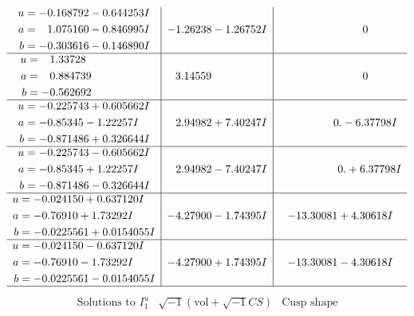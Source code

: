 \documentclass[1p]{elsarticle_modified}
\theoremstyle{definition}
\newcommand{\I}{\sqrt{-1}}
\begin{document}
$$\begin{array}{c|c|c}
\begin{aligned}
u &= -0.168792 - 0.644253 I \\
a &= \phantom{-}1.075160 - 0.846995 I \\
b &= -0.303616 - 0.146890 I\end{aligned}
 & -1.26238 - 1.26752 I & \phantom{-0.000000 } 0 \\ \hline\begin{aligned}
u &= \phantom{-}1.33728\phantom{ +0.000000I} \\
a &= \phantom{-}0.884739\phantom{ +0.000000I} \\
b &= -0.562692\phantom{ +0.000000I}\end{aligned}
 & \phantom{-}3.14559\phantom{ +0.000000I} & \phantom{-0.000000 } 0 \\ \hline\begin{aligned}
u &= -0.225743 + 0.605662 I \\
a &= -0.85345 - 1.22257 I \\
b &= -0.871486 + 0.326644 I\end{aligned}
 & \phantom{-}2.94982 + 7.40247 I & \phantom{-0.000000 } 0. - 6.37798 I \\ \hline\begin{aligned}
u &= -0.225743 - 0.605662 I \\
a &= -0.85345 + 1.22257 I \\
b &= -0.871486 - 0.326644 I\end{aligned}
 & \phantom{-}2.94982 - 7.40247 I & \phantom{-0.000000 -}0. + 6.37798 I \\ \hline\begin{aligned}
u &= -0.024150 + 0.637120 I \\
a &= -0.76910 + 1.73292 I \\
b &= -0.0225561 + 0.0154055 I\end{aligned}
 & -4.27900 - 1.74395 I & -13.30081 + 4.30618 I \\ \hline\begin{aligned}
u &= -0.024150 - 0.637120 I \\
a &= -0.76910 - 1.73292 I \\
b &= -0.0225561 - 0.0154055 I\end{aligned}
 & -4.27900 + 1.74395 I & -13.30081 - 4.30618 I\\
 \hline 
 \end{array}$$\newpage$$\begin{array}{c|c|c}  
\text{Solutions to }I^u_{1}& \I (\text{vol} + \sqrt{-1}CS) & \text{Cusp shape}\\
 \hline 
\begin{aligned}

\end{aligned}
\end{array}$$
\end{document}
